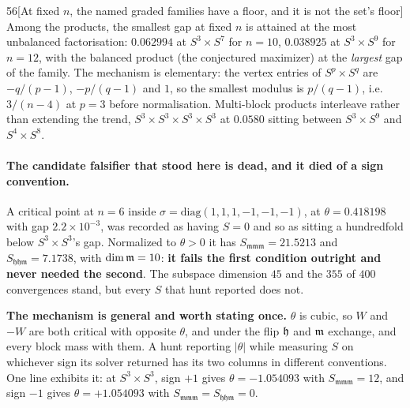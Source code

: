 \begin{Obs}{56}[At fixed $n$, the named graded families have a floor, and it is not the set's floor]
Among the products, the smallest gap at fixed $n$ is attained at the most unbalanced factorisation: $0.062994$ at $S^3\times S^7$ for $n=10$, $0.038925$ at $S^3\times S^9$ for $n=12$, with the balanced product (the conjectured maximizer) at the \emph{largest} gap of the family. The mechanism is elementary: the vertex entries of $S^p\times S^q$ are $-q/(p-1)$, $-p/(q-1)$ and $1$, so the smallest modulus is $p/(q-1)$, i.e.\ $3/(n-4)$ at $p=3$ before normalisation. Multi-block products interleave rather than extending the trend, $S^3\times S^3\times S^3\times S^3$ at $0.0580$ sitting between $S^3\times S^9$ and $S^4\times S^8$.
\end{Obs}

\paragraph{The candidate falsifier that stood here is dead, and it died of a sign convention.} A critical point at $n=6$ inside $\sigma=\mathrm{diag}(1,1,1,-1,-1,-1)$, at $\theta=0.418198$ with gap $2.2\times10^{-3}$, was recorded as having $S=0$ and so as sitting a hundredfold below $S^3\times S^3$'s gap. Normalized to $\theta>0$ it has $S_{\mathfrak{mmm}}=21.5213$ and $S_{\mathfrak{hhm}}=7.1738$, with $\dim\mathfrak{m}=10$: \textbf{it fails the first condition outright and never needed the second}. The subspace dimension $45$ and the $355$ of $400$ convergences stand, but every $S$ that hunt reported does not.

\textbf{The mechanism is general and worth stating once.} $\theta$ is cubic, so $W$ and $-W$ are both critical with opposite $\theta$, and under the flip $\mathfrak{h}$ and $\mathfrak{m}$ exchange, and every block mass with them. A hunt reporting $|\theta|$ while measuring $S$ on whichever sign its solver returned has its two columns in different conventions. One line exhibits it: at $S^3\times S^3$, sign $+1$ gives $\theta=-1.054093$ with $S_{\mathfrak{mmm}}=12$, and sign $-1$ gives $\theta=+1.054093$ with $S_{\mathfrak{mmm}}=S_{\mathfrak{hhm}}=0$.

